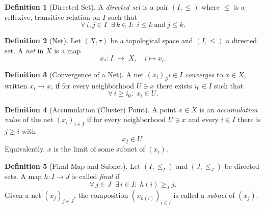 \documentclass[11pt,a4paper]{article}
\theoremstyle{definition}
\newtheorem{definition}{Definition}[section]
\theoremstyle{plain}
\theoremstyle{remark}
\begin{document}
\begin{definition}[Directed Set]
A \emph{directed set} is a pair \((I,\le)\) where \(\le\) is a reflexive, transitive relation on \(I\) such that
\[
  \forall\,i,j\in I\;\;\exists\,k\in I:\;i\le k\ \text{and}\ j\le k.
\]
\end{definition}

\begin{definition}[Net]
Let \((X,\tau)\) be a topological space and \((I,\le)\) a directed set.  A \emph{net} in \(X\) is a map
\[
  x_*\colon I \;\longrightarrow\; X,
  \quad i \mapsto x_i.
\]
\end{definition}

\begin{definition}[Convergence of a Net]
A net \((x_i)_S{i\in I}\) \emph{converges} to \(x\in X\), written \(x_i\to x\), if for every neighborhood \(U\ni x\) there exists \(i_0\in I\) such that
\[
  \forall\,i\ge i_0:\;x_i\in U.
\]
\end{definition}

\begin{definition}[Accumulation (Cluster) Point]
A point \(x\in X\) is an \emph{accumulation value} of the net \((x_i)_{i\in I}\) if for every neighborhood \(U\ni x\) and every \(i\in I\) there is \(j\ge i\) with
\[
  x_j\in U.
\]
Equivalently, \(x\) is the limit of some subnet of \((x_i)\).
\end{definition}

\begin{definition}[Final Map and Subnet]
Let \((I,\le_I)\) and \((J,\le_J)\) be directed sets.  A map \(h\colon I\to J\) is called \emph{final} if
\[
  \forall\,j\in J\;\;\exists\,i\in I:\;h(i)\ge_J j.
\]
Given a net \((x_j)_{j\in J}\), the composition \((x_{h(i)})_{i\in I}\) is called a \emph{subnet} of \((x_j)\).
\end{definition}
\end{document}
